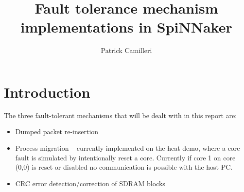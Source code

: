 \documentclass[oneside, a4paper, 11pt]{memoir}
\title{Fault tolerance mechanism implementations in SpiNNaker}
\author{Patrick Camilleri}
\makeatletter
\newlength\drop
\newcommand*{\titleGM}{%
\thispagestyle{empty}
\begingroup%
\drop = 0.1\textheight
\vspace*{\baselineskip}
\vfill
\hbox{%
  \hspace*{0.2\textwidth}%
  \rule{1pt}{\dimexpr\textheight-28pt\relax}%
  \hspace*{0.05\textwidth}%
  \parbox[b]{0.75\textwidth}{%
    \vbox{%
      \vspace{\drop}
      {\Huge\bfseries\raggedright\@title\par}\vskip2.37\baselineskip
      {\Large\itshape PRiME Project }\\[4\baselineskip]
      {\Large\bfseries\@author\par}
      \vspace{0.5\textheight}
    }%
  }%
}%
\vfill
\cleardoublepage %
\null %
\endgroup}
\makeatother
\begin{document}
\begin{titlingpage}
\titleGM
\end{titlingpage}


\frontmatter
\tableofcontents

\mainmatter
{}

\chapter{Introduction}
The three fault-tolerant mechanisms that will be dealt with in this report are:
\begin{itemize}
\item Dumped packet re-insertion
\item Process migration -- currently implemented on the heat demo, where a core fault is simulated by intentionally reset a core. Currently if core 1 on core (0,0) is reset or disabled no communication is possible with the host PC.
\item CRC error detection/correction of SDRAM blocks
\end{itemize}
	
\end{document}
